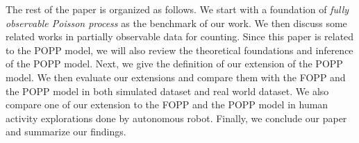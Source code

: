 The rest of the paper is organized as follows. We start with a foundation of \textit{fully observable Poisson process} as the benchmark of our work. We then discuss some related works in partially observable data for counting. Since this paper is related to the POPP model, we will also review the theoretical foundations and inference of the POPP model. Next, we give the definition of our extension of the POPP model. We then evaluate our extensions and compare them with the FOPP and the POPP model in both simulated dataset and real world dataset. We also compare one of our extension to the FOPP and the POPP model in human activity explorations done by autonomous robot. Finally, we conclude our paper and summarize our findings.
% 


